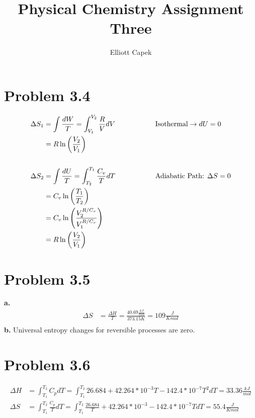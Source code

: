 \documentclass[10pt]{article} %
\title{Physical Chemistry Assignment Three}
\author{Elliott Capek}
\begin{document}
\maketitle{}

\section{Problem 3.4}
\begin{align*}
  \Delta S_1 &= \int \frac{dW}{T} = \int_{V_1}^{V_2} \frac{R}{V}dV
  \hspace{2cm} \mbox{Isothermal} \rightarrow dU = 0\\
  &= R\ln\left(\frac{V_2}{V_1}\right)\\
  \vspace{1cm}\\
  \Delta S_2 &= \int \frac{dU}{T} = \int_{T_2}^{T_1} \frac{C_v}{T}dT
  \hspace{2cm} \mbox{Adiabatic Path: } \Delta S = 0\\
  &= C_v\ln\left(\frac{T_1}{T_2}\right)\\
  &= C_v\ln\left(\frac{V_2^{R/C_v}}{V_1^{R/C_v}}\right)\\
  &= R\ln\left(\frac{V_2}{V_1}\right)\\
\end{align*}

\section{Problem 3.5}
\textbf{a.}
\begin{align*}
  \Delta S &= \frac{\Delta H}{T} = \frac{40.69 \frac{kJ}{mol}}{373.15K} = 109 \frac{J}{K mol}\\
\end{align*}
\textbf{b.}
Universal entropy changes for reversible processes are zero.\\

\section{Problem 3.6}
\begin{align*}
  \Delta H &= \int_{T_1}^{T_2} C_p dT = \int_{T_1}^{T_2} 26.684 + 42.264*10^{-3}T - 142.4*10^{-7}T^2 dT = 33.36 \frac{kJ}{mol}\\
  \Delta S &= \int_{T_1}^{T_2} \frac{C_p}{T} dT = \int_{T_1}^{T_2} \frac{26.684}{T} + 42.264*10^{-3} - 142.4*10^{-7}T dT = 55.4 \frac{J}{K mol}\\
\end{align*}
\end{document}
